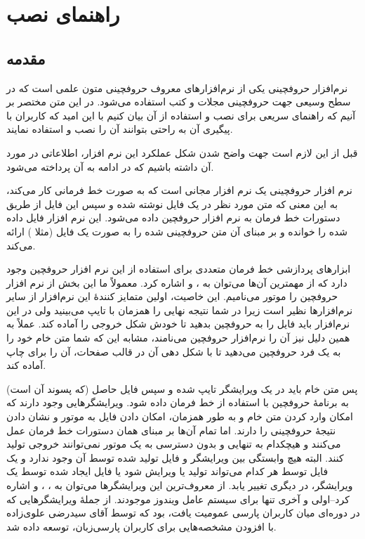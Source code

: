     \chapter{راهنمای نصب  \lr{\LaTeX}} 
    \label{chap:installation}

    \section{مقدمه}
    نرم‌افزار حروفچینی \lr{\TeX} یکی از نرم‌افزارهای معروف حروفچینی متون علمی است
    که در سطح وسیعی جهت حروفچینی  مجلات و کتب استفاده می‌شود. در این متن مختصر بر آنیم
    که راهنمای سریعی برای نصب و استفاده از آن بیان کنیم با این امید که کاربران با پیگیری آن
    به راحتی  بتوانند آن را نصب و استفاده نمایند.

    قبل از این لازم است جهت واضح شدن شکل عملکرد این نرم افزار، اطلاعاتی در مورد آن داشته
    باشیم که در ادامه به آن پرداخته می‌شود.

    نرم افزار حروفچینی \lr{\TeX} یک نرم افزار مجانی است که به صورت خط فرمانی کار می‌کند، به این
    معنی که متن مورد نظر در یک فایل نوشته شده و سپس این فایل از طریق دستورات خط
    فرمان به نرم افزار حروفچین \lr{\TeX} داده می‌شود. این نرم افزار فایل داده شده را خوانده و بر
    مبنای آن متن حروفچینی شده را به صورت یک فایل (مثلا ) ارائه می‌کند.

    ابزارهای پردازشی خط فرمان متعددی برای استفاده از این نرم افزار حروفچین وجود دارد که از مهمترین 
    آن‌ها می‌توان به ،  و  اشاره کرد. معمولاً ما این بخش از
    نرم افزار حروفچین را موتور \lr{\TeX} می‌نامیم. این خاصیت، اولین متمایز کنندۀ این نرم‌افزار
    از سایر نرم‌افزارها نظیر   است زیرا در  شما نتیجه نهایی را همزمان با تایپ
     می‌بینید ولی در این نرم‌افزار باید فایل را به حروفچین بدهید تا خودش شکل خروجی را آماده
     کند. عملاً به همین دلیل نیز آن را نرم‌افزار حروفچین می‌نامند، مشابه این که شما متن خام 
     خود را به یک فرد حروفچین می‌دهید تا با شکل دهی آن در قالب صفحات، آن را برای چاپ
     آماده کند.
     
     پس متن خام باید در یک ویرایشگر تایپ شده و سپس فایل حاصل (که پسوند آن  است)
     به برنامۀ حروفچین
     با استفاده از خط فرمان داده شود. ویرایشگرهایی وجود دارند که امکان وارد کردن متن خام
     و به طور همزمان، امکان دادن فایل به موتور \lr{\TeX} و نشان دادن نتیجۀ حروفچینی را دارند. 
     اما تمام آن‌ها بر مبنای همان دستورات خط فرمان عمل می‌کنند و هیچکدام به تنهایی و بدون
     دسترسی به یک موتور \lr{\TeX} نمی‌توانند خروجی تولید کنند. البته هیچ وابستگی بین
     ویرایشگر و فایل تولید شده توسط آن وجود ندارد و یک فایل توسط هر کدام می‌تواند 
     تولید یا ویرایش شود یا فایل ایجاد شده توسط  یک ویرایشگر، در دیگری تغییر یابد.
     از معروف‌ترین این ویرایشگرها می‌توان به 
     ، ، 
    و    اشاره کرد--اولی و آخری تنها برای سیستم عامل ویندوز موجودند. از جملهٔ ویرایشگرهایی که در دوره‌ای  میان کاربران پارسی 
    عمومیت یافت،  بود که توسط آقای سیدرضی علوی‌زاده با افزودن مشخصه‌هایی برای کاربران پارسی‌زبان، توسعه داده شد\cite{biditexmaker}.

